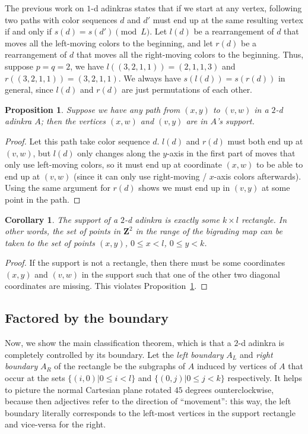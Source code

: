 \documentclass[12pt,twoside,singlespace]{article}
\numberwithin{equation}{section}
\newtheorem{cor}[equation]{Corollary}
\newtheorem{prop}[equation]{Proposition}
\theoremstyle{definition}
\newcommand{\ZZ}{\mathbf{Z}}
\begin{document}
The previous work on $1$-d adinkras states that if we start at any vertex, following two paths with color sequences $d$ and $d'$ must end up at the same resulting vertex if and only if $s(d) = s(d') \pmod{L}$. Let $l(d)$ be a rearrangement of $d$ that moves all the left-moving colors to the beginning, and let $r(d)$ be a rearrangement of $d$ that moves all the right-moving colors to the beginning. Thus, suppose $p = q = 2$, we have $l((3,2,1,1)) = (2,1,1,3)$ and $r((3,2,1,1)) = (3,2,1,1)$. We always have $s(l(d)) = s(r(d))$ in general, since $l(d)$ and $r(d)$ are just permutations of each other.

\begin{prop}
\label{prop:rectangle-completion}
Suppose we have any path from $(x,y)$ to $(v,w)$ in a $2$-d adinkra $A$; then the vertices $(x,w)$ and $(v,y)$ are in $A$'s support.
\end{prop}
\begin{proof}
Let this path take color sequence $d$. $l(d)$ and $r(d)$ must both end up at $(v,w)$, but $l(d)$ only changes along the $y$-axis in the first part of moves that only use left-moving colors, so it must end up at coordinate $(x,w)$ to be able to end up at $(v,w)$ (since it can only use right-moving / $x$-axis colors afterwards). Using the same argument for $r(d)$ shows we must end up in $(v,y)$ at some point in the path.
\end{proof}

\begin{cor}
\label{cor:rectangle}
The support of a $2$-d adinkra is exactly some $k \times l$ rectangle. In other words, the set of points in $\ZZ^2$ in the range of the bigrading map can be taken to the set of points $(x,y)$, $0 \leq x < l$, $0 \leq y < k$.
\end{cor}
\begin{proof}
If the support is not a rectangle, then there must be some coordinates $(x,y)$ and $(v,w)$ in the support such that one of the other two diagonal coordinates are missing. This violates Proposition~\ref{prop:rectangle-completion}.
\end{proof}

\subsection{Factored by the boundary}

Now, we show the main classification theorem, which is that a $2$-d adinkra is completely controlled by its boundary. Let the \emph{left boundary} $A_L$ and \emph{right boundary} $A_R$ of the rectangle be the subgraphs of $A$ induced by vertices of $A$ that occur at the sets $\{(i,0) | 0 \leq i < l \}$ and $\{(0, j) | 0 \leq j < k \}$ respectively. It helps to picture the normal Cartesian plane rotated $45$ degrees ounterclockwise, because then adjectives refer to the direction of ``movement'': this way, the left boundary literally corresponds to the left-most vertices in the support rectangle and vice-versa for the right.
\end{document}
